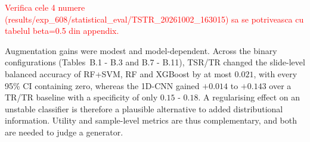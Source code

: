 \documentclass[12pt]{article}
\theoremstyle{paper}
\begin{document}
\textcolor{red}{Verifica cele 4 numere (results/exp\_608/statistical\_eval/TSTR\_20261002\_163015) sa se potriveasca cu tabelul beta=0.5 din appendix.}

Augmentation gains were modest and model-dependent. Across the binary configurations
(Tables~B.1 - B.3 and B.7 - B.11), TSR/TR changed the slide-level balanced accuracy of RF+SVM, RF and
XGBoost by at most $0.021$, with every 95\% CI containing zero, whereas the 1D-CNN gained $+0.014$
to $+0.143$ over a TR/TR baseline with a specificity of only $0.15$ - $0.18$. A regularising effect on
an unstable classifier is therefore a plausible alternative to added distributional information.
Utility and sample-level metrics are thus complementary, and both are needed to judge a generator.




\end{document}
